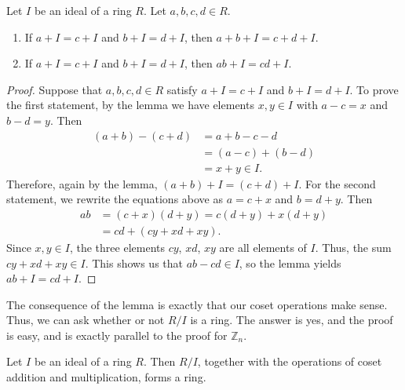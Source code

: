 \begin{lemma}
Let $I$ be an ideal of a ring $R$. Let $a,b,c,d\in R$.

\begin{enumerate}
\item If $a+I=c+I$ and $b+I=d+I$, then $a+b+I=c+d+I$.

\item If $a+I=c+I$ and $b+I=d+I$, then $ab+I=cd+I$.
\end{enumerate}
\end{lemma}

\begin{proof}
Suppose that $a,b,c,d\in R$ satisfy $a+I=c+I$ and $b+I=d+I$. To prove the
first statement, by the lemma we have elements $x,y\in I$ with $a-c=x$ and
$b-d=y$. Then
\begin{align*}
(a+b)-(c+d)  & =a+b-c-d\\
& =(a-c)+(b-d)\\
& =x+y\in I.
\end{align*}
Therefore, again by the lemma, $(a+b)+I=(c+d)+I$. For the second statement, we
rewrite the equations above as $a=c+x$ and $b=d+y$. Then
\begin{align*}
ab  & =(c+x)(d+y)=c(d+y)+x(d+y)\\
& =cd+(cy+xd+xy).
\end{align*}
Since $x,y\in I$, the three elements $cy$, $xd$, $xy$ are all elements of $I$.
Thus, the sum $cy+xd+xy\in I$. This shows us that $ab-cd\in I$, so the lemma
yields $ab+I=cd+I$.
\end{proof}


The consequence of the lemma is exactly that our coset operations make sense.
Thus, we can ask whether or not $R/I$ is a ring. The answer is yes, and the
proof is easy, and is exactly parallel to the proof for $\mathbb{Z}_{n}$.

\begin{theorem}
Let $I$ be an ideal of a ring $R$. Then $R/I$, together with the operations of
coset addition and multiplication, forms a ring.
\end{theorem}

